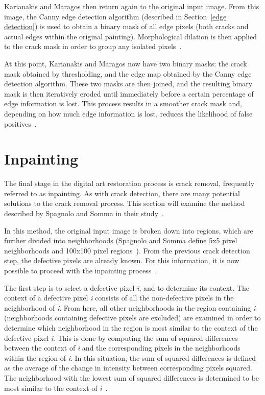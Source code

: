 \documentclass{sig-alternate}
\begin{document}
Karianakis and Maragos then return again to the original input image. From this image, the Canny edge detection algorithm (described in Section~\ref{edge detection}) is used to obtain a binary mask of all edge pixels (both cracks and actual edges within the original painting). Morphological dilation is then applied to the crack mask in order to group any isolated pixels~\cite{Theran:2013}.

At this point, Karianakis and Maragos now have two binary masks: the crack mask obtained by thresholding, and the edge map obtained by the Canny edge detection algorithm. These two masks are then joined, and the resulting binary mask is then iteratively eroded until immediately before a certain percentage of edge information is lost. This process results in a smoother crack mask and, depending on how much edge information is lost, reduces the likelihood of false positives~\cite{Theran:2013}.

\section{Inpainting}\label{inpainting}
The final stage in the digital art restoration process is crack removal, frequently referred to as inpainting. As with crack detection, there are many potential solutions to the crack removal process. This section will examine the method described by Spagnolo and Somma in their study~\cite{TopHat:2010}.

In this method, the original input image is broken down into regions, which are further divided into neighborhoods (Spagnolo and Somma define 5x5 pixel neighborhoods and 100x100 pixel regions~\cite{TopHat:2010}). From the previous crack detection step, the defective pixels are already known. For this information, it is now possible to proceed with the inpainting process~\cite{TopHat:2010}.

The first step is to select a defective pixel \textit{i}, and to determine its context. The context of a defective pixel \textit{i} consists of all the non-defective pixels in the neighborhood of \textit{i}. From here, all other neighborhoods in the region containing \textit{i} (neighborhoods containing defective pixels are excluded) are examined in order to determine which neighborhood in the region is most similar to the context of the defective pixel \textit{i}. This is done by computing the sum of squared differences between the context of \textit{i} and the corresponding pixels in the neighborhoods within the region of \textit{i}. In this situation, the sum of squared differences is defined as the average of the change in intensity between corresponding pixels squared. The neighborhood with the lowest sum of squared differences is determined to be most similar to the context of \textit{i}~\cite{TopHat:2010}.
\end{document}

